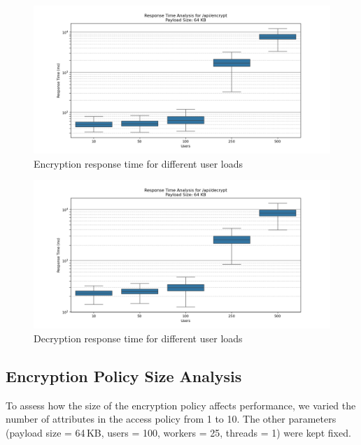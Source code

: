 \documentclass[cic,tc,english]{iiufrgs}
\begin{document}
            \begin{figure}
                \centering
                \includegraphics[width=\textwidth]{images/phase3/response_time_api_encrypt_64KB.png}
                \caption{Encryption response time for different user loads}
                \label{fig:encrypt_user_load}
            \end{figure}

            \begin{figure}
                \centering
                \includegraphics[width=\textwidth]{images/phase3/response_time_api_decrypt_64KB.png}
                \caption{Decryption response time for different user loads}
                \label{fig:decrypt_user_load}
            \end{figure}

            \subsection{Encryption Policy Size Analysis}
        \label{subsec:encryption_policy_size_analysis}

            To assess how the size of the encryption policy affects performance, we varied the number of attributes in the access policy from 1 to 10. The other parameters (payload size = 64\,KB, users = 100, workers = 25, threads = 1) were kept fixed.
\end{document}
